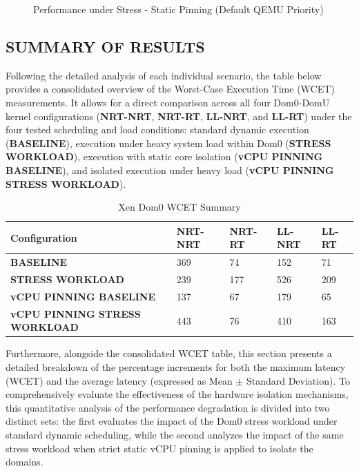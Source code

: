 \begin{figure}
\centering

\caption{Performance under Stress - Static Pinning (Default QEMU
Priority)}
\end{figure}

\subsection{SUMMARY OF RESULTS}\label{summary-of-results-1}

Following the detailed analysis of each individual scenario, the table
below provides a consolidated overview of the Worst-Case Execution Time
(WCET) measurements. It allows for a direct comparison across all four
Dom0-DomU kernel configurations (\textbf{NRT-NRT}, \textbf{NRT-RT},
\textbf{LL-NRT}, and \textbf{LL-RT}) under the four tested scheduling
and load conditions: standard dynamic execution (\textbf{BASELINE}),
execution under heavy system load within Dom0 (\textbf{STRESS
WORKLOAD}), execution with static core isolation (\textbf{vCPU PINNING
BASELINE}), and isolated execution under heavy load (\textbf{vCPU
PINNING STRESS WORKLOAD}).

\begin{table}
\centering
\caption{Xen Dom0 WCET Summary}
\label{tab:xen:wcet-summary}
\begin{tabularx}{\linewidth}{@{}YYYYY@{}}
\toprule
Configuration & NRT-NRT & NRT-RT & LL-NRT & LL-RT\tabularnewline
\midrule
\textbf{BASELINE} & 369 & 74 & 152 & 71\tabularnewline
\textbf{STRESS WORKLOAD} & 239 & 177 & 526 & 209\tabularnewline
\textbf{vCPU PINNING BASELINE} & 137 & 67 & 179 & 65\tabularnewline
\textbf{vCPU PINNING STRESS WORKLOAD} & 443 & 76 & 410 & 163\tabularnewline
\bottomrule
\end{tabularx}
\end{table}

Furthermore, alongside the consolidated WCET table, this section
presents a detailed breakdown of the percentage increments for both the
maximum latency (WCET) and the average latency (expressed as Mean
\(\pm\) Standard Deviation). To comprehensively evaluate the
effectiveness of the hardware isolation mechanisms, this quantitative
analysis of the performance degradation is divided into two distinct
sets: the first evaluates the impact of the Dom0 stress workload under
standard dynamic scheduling, while the second analyzes the impact of the
same stress workload when strict static vCPU pinning is applied to
isolate the domains.


